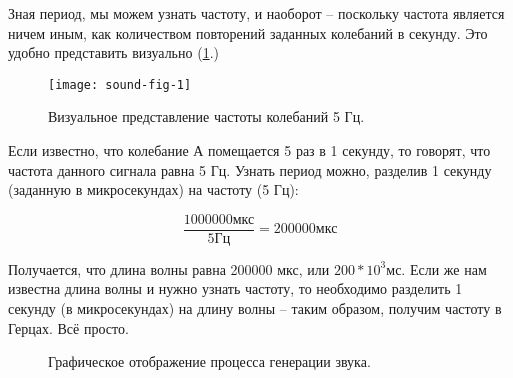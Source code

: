 \documentclass[../sparc.tex]{subfiles}
\begin{document}
Зная период, мы можем узнать частоту, и наоборот -- поскольку частота является
ничем иным, как количеством повторений заданных колебаний в секунду. Это удобно
представить визуально (\ref{fig:sound-fig-1}.)

\begin{figure}[h]
  \centering
  \texttt{[image: sound-fig-1]}
  \caption{Визуальное представление частоты колебаний 5 Гц.}
  \label{fig:sound-fig-1}
\end{figure}

Если известно, что колебание А помещается 5 раз в 1 секунду, то говорят, что
частота данного сигнала равна 5 Гц. Узнать период можно, разделив 1 секунду
(заданную в микросекундах) на частоту (5 Гц):

\begin{equation}
  \frac{1000000 \mbox{мкс}}{5 \mbox{Гц}} = 200000 \mbox{мкс}
\end{equation}

Получается, что длина волны равна 200000 мкс, или $ 200 * 10^3 \mbox{мс} $. Если
же нам известна длина волны и нужно узнать частоту, то необходимо разделить 1
секунду (в микросекундах) на длину волны -- таким образом, получим частоту в
Герцах. Всё просто.

\begin{figure}[H]
  \caption{Графическое отображение процесса генерации звука.}
  \label{fig:sound-graph}
\end{figure}
\end{document}
